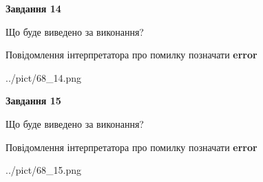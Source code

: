 \documentclass[11pt, ukrainian]{article}
\begin{document}
{\begin {large}
{\begin {center}\textbf{Завдання 14}\end {center}}\par
Що буде виведено за виконання? \par
Повідомлення інтерпретатора про помилку позначати \textbf{error}

\begin{center}
	{../pict/68_14.png}
\end{center}
\newpage

{\begin {center}\textbf{Завдання 15}\end {center}}\par
Що буде виведено за виконання? \par
Повідомлення інтерпретатора про помилку позначати \textbf{error}

\begin{center}
	{../pict/68_15.png}
\end{center}
\newpage

\end {large}}
\end{document}
